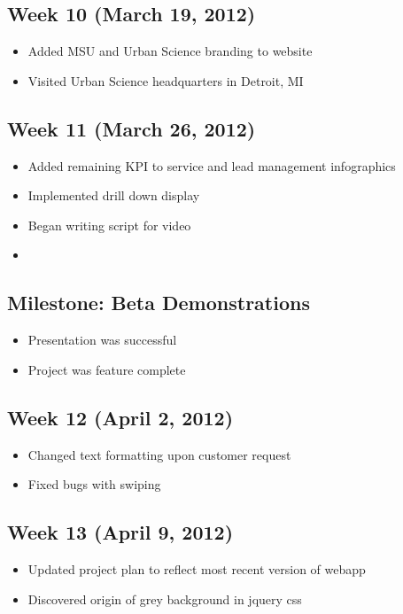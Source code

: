 \documentclass[11pt,a4paper,oneside]{article}
\begin{document}
\subsection{Week 10 (March 19, 2012)}
\begin{itemize}
\item Added MSU and Urban Science branding to website
\item Visited Urban Science headquarters in Detroit, MI
\end{itemize}

\subsection{Week 11 (March 26, 2012)}
\begin{itemize}
\item Added remaining KPI to service and lead management infographics
\item Implemented drill down display
\item Began writing script for video
\item 
\end{itemize}

\subsection{Milestone: Beta Demonstrations}
\begin{itemize}
\item Presentation was successful
\item Project was feature complete
\end{itemize}

\subsection{Week 12 (April 2, 2012)}
\begin{itemize}
\item Changed text formatting upon customer request
\item Fixed bugs with swiping 
\end{itemize}

\subsection{Week 13 (April 9, 2012)}
\begin{itemize}
\item Updated project plan to reflect most recent version of webapp
\item Discovered origin of grey background in jquery css
\end{itemize}
\end{document}
